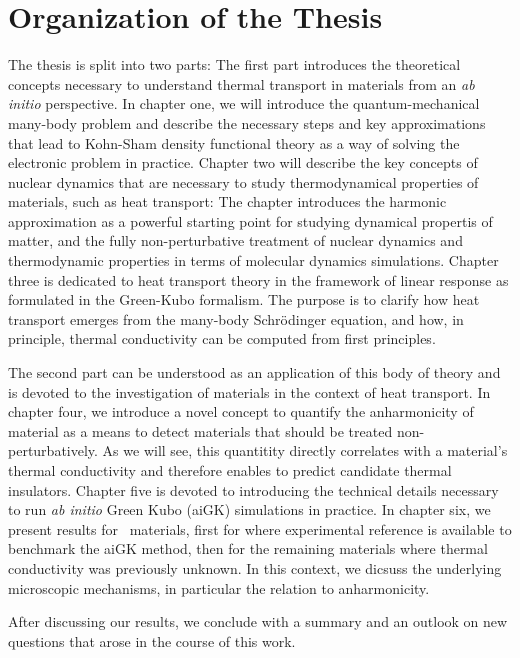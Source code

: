 \section*{Organization of the Thesis}
The thesis is split into two parts: The first part introduces the theoretical concepts necessary to understand thermal transport in materials from an \emph{ab initio} perspective.
In chapter one, we will introduce the quantum-mechanical many-body problem and describe the necessary steps and key approximations that lead to Kohn-Sham density functional theory as a way of solving the electronic problem in practice. Chapter two will describe the key concepts of nuclear dynamics that are necessary to study thermodynamical properties of materials, such as heat transport: The chapter introduces the harmonic approximation as a powerful starting point for studying dynamical propertis of matter, and the fully non-perturbative treatment of nuclear dynamics and thermodynamic properties in terms of molecular dynamics simulations. Chapter three is dedicated to heat transport theory in the framework of linear response as formulated in the Green-Kubo formalism. The purpose is to clarify how heat transport emerges from the many-body Schr\"odinger equation, and how, in principle, thermal conductivity can be computed from first principles.

The second part can be understood as an application of this body of theory and is devoted to the investigation of materials in the context of heat transport. In chapter four, we introduce a novel concept to quantify the anharmonicity of material as a means to detect materials that should be treated non-perturbatively. As we will see, this quantitity directly correlates with a material's thermal conductivity and therefore enables to predict candidate thermal insulators. Chapter five is devoted to introducing the technical details necessary to run \emph{ab initio} Green Kubo (aiGK) simulations in practice. In chapter six, we present results for ~materials, first for  where experimental reference is available to benchmark the aiGK method, then for the remaining materials where thermal conductivity was previously unknown. In this context, we dicsuss the underlying microscopic mechanisms, in particular the relation to anharmonicity.

After discussing our results, we conclude with a summary and an outlook on new questions that arose in the course of this work.
